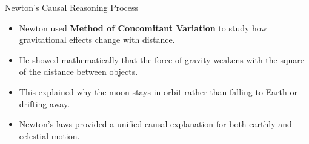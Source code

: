 \documentclass{beamer}
\begin{document}
\begin{frame}{Newton's Causal Reasoning Process}
    \begin{itemize}
        \item Newton used \textbf{Method of Concomitant Variation} to study how gravitational effects change with distance.
        \item He showed mathematically that the force of gravity weakens with the square of the distance between objects.
        \item This explained why the moon stays in orbit rather than falling to Earth or drifting away.
        \item Newton's laws provided a unified causal explanation for both earthly and celestial motion.
    \end{itemize}
    
    \begin{center}
    \end{center}
\end{frame}
\end{document}
